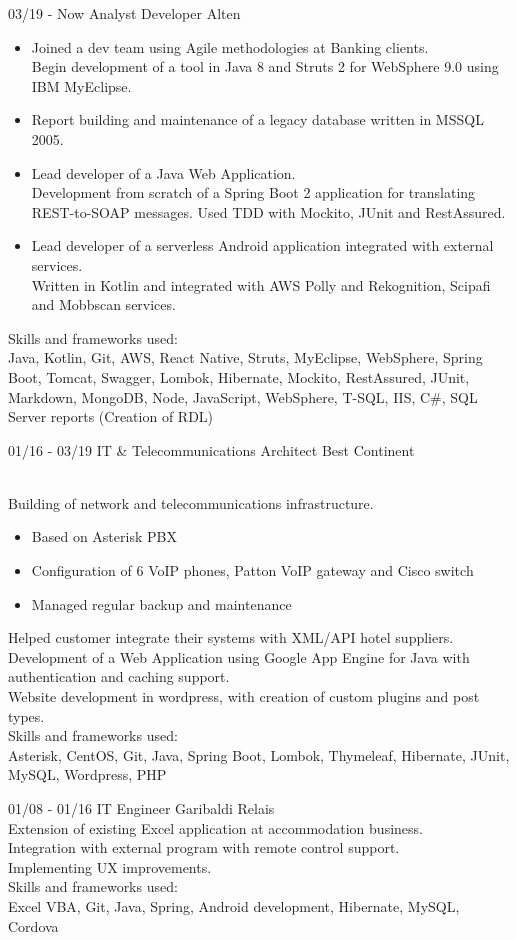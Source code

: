 \documentclass[]{friggeri-cv}
\begin{document}
\begin{entrylist}
  \entry
    {03/19 - Now}
    {Analyst Developer}
    {Alten}
    {{\begin{itemize}
        \item {Joined a dev team using Agile methodologies at Banking clients.\\Begin development of a tool in Java 8 and Struts 2 for WebSphere 9.0 using IBM MyEclipse.}
        \item {Report building and maintenance of a legacy database written in MSSQL 2005.}
        \item {Lead developer of a Java Web Application.\\Development from scratch of a Spring Boot 2 application for translating REST-to-SOAP messages. Used TDD with Mockito, JUnit and RestAssured.}
        \item {Lead developer of a serverless Android application integrated with external services.\\ Written in Kotlin and integrated with AWS Polly and Rekognition, Scipafi and Mobbscan services.}
    \end{itemize}}
      {Skills and frameworks used:\\Java, Kotlin, Git, AWS, React Native, Struts, MyEclipse, WebSphere, Spring Boot, Tomcat, Swagger, Lombok, Hibernate, Mockito, RestAssured, JUnit, Markdown, MongoDB, Node, JavaScript, WebSphere, T-SQL, IIS, C\#, SQL Server reports (Creation of RDL)}}
  \entry
    {01/16 - 03/19}
    {IT \& Telecommunications Architect}
    {Best Continent}
    {{\\Building of network and telecommunications infrastructure.}
            {\begin{itemize}
                \item{Based on Asterisk PBX}
                \item{Configuration of 6 VoIP phones, Patton VoIP gateway and Cisco switch}
                \item{Managed regular backup and maintenance}
            \end{itemize}}
    {Helped customer integrate their systems with XML/API hotel suppliers.}
    {\\Development of a Web Application using Google App Engine for Java with authentication and caching support.}
    {\\Website development in wordpress, with creation of custom plugins and post types.}
    {\\Skills and frameworks used:\\Asterisk, CentOS, Git, Java, Spring Boot, Lombok, Thymeleaf, Hibernate, JUnit, MySQL, Wordpress, PHP}}
  \entry
    {01/08 - 01/16}
    {IT Engineer}
    {Garibaldi Relais}
    {{\\Extension of existing Excel application at accommodation business.}
    {\\Integration with external program with remote control support.}
    {\\Implementing UX improvements.}
    {\\Skills and frameworks used:\\Excel VBA, Git, Java, Spring, Android development, Hibernate, MySQL, Cordova}}
\end{entrylist}
\end{document}

